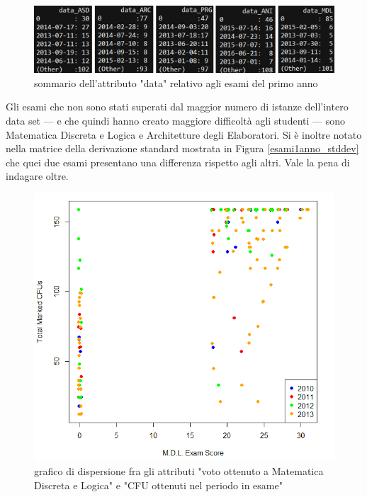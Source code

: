                 \begin{figure}
                    \centering
                    \caption{sommario dell'attributo "data" relativo agli esami del primo anno}
                    \label{1annosommario}
                	\includegraphics[scale=0.70]{img/sommario_1_anno.png}
                \end{figure}

                Gli esami che non sono stati superati dal maggior numero di istanze dell’intero data set --- e che quindi hanno creato maggiore difficoltà agli studenti --- sono Matematica Discreta e Logica e Architetture degli Elaboratori. Si è inoltre notato nella matrice della derivazione standard mostrata in Figura \ref{esami1anno_stddev} che quei due esami presentano una differenza rispetto agli altri. Vale la pena di indagare oltre. \\

                \begin{figure}
                    \centering
                    \caption{grafico di dispersione fra gli attributi "voto ottenuto a Matematica Discreta e Logica" e "CFU ottenuti nel periodo in esame"}
                    \label{mdl}
                	\includegraphics[scale=0.60]{img/scatter_plot_5.png}
                \end{figure}


